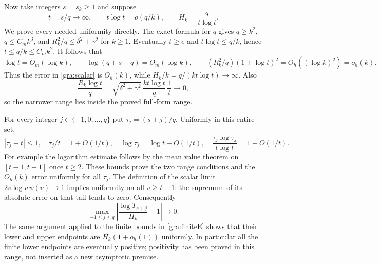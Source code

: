 \documentclass[11pt,a4paper]{article}
\begin{document}
Now take integers $s=s_k\ge1$ and suppose
\begin{equation}
 t=s/q\longrightarrow\infty,\qquad
 t\log t=o(q/k),\qquad H_k=\frac{q}{t\log t}.
 \tag{GRA19}\label{gra:narrow}
\end{equation}
We prove every needed uniformity directly.  The exact formula for $q$
gives $q\ge k^2$, $q\le C_mk^3$, and
$R_k^2/q\le\delta^2+\gamma^2$ for $k\ge1$.  Eventually $t\ge e$ and
$t\log t\le q/k$, hence $t\le q/k\le C_mk^2$.  It follows that
\[
 \log t=O_m(\log k),\qquad
 \log(q+s+q)=O_m(\log k),\qquad
 (R_k^2/q)(1+\log t)^2=O_h((\log k)^2)=o_h(k).
\]
Thus the error in \eqref{gra:scalar} is $O_h(k)$, while
$H_k/k=q/(kt\log t)\to\infty$.  Also
\[
 \frac{R_k\log t}{q}
 =\sqrt{\delta^2+\gamma^2}\,
   \frac{kt\log t}{q}\,\frac1t\longrightarrow0,
\]
so the narrower range lies inside the proved full-form range.

For every integer $j\in\{-1,0,\ldots,q\}$ put
$\tau_j=(s+j)/q$.  Uniformly in this entire set,
\[
 |\tau_j-t|\le1,\quad \tau_j/t=1+O(1/t),\quad
 \log\tau_j=\log t+O(1/t),\quad
 \frac{\tau_j\log\tau_j}{t\log t}=1+O(1/t).
\]
For example the logarithm estimate follows by the mean value theorem
on $[t-1,t+1]$ once $t\ge2$.  These bounds prove the two range
conditions and the $O_h(k)$ error uniformly for all $\tau_j$.
The definition of the scalar limit
$2v\log v\,\psi(v)\to1$ implies uniformity on all $v\ge t-1$:
the supremum of its absolute error on that tail tends to zero.
Consequently
\begin{equation}
 \max_{-1\le j\le q}
 \left|\frac{\log T_{s+j}}{H_k}-1\right|\longrightarrow0.
 \tag{GRA20}\label{gra:uniformT}
\end{equation}
The same argument applied to the finite bounds in
\eqref{gra:finiteE} shows that their lower and upper endpoints are
$H_k(1+o_h(1))$ uniformly.  In particular all the finite lower endpoints
are eventually positive; positivity has been proved in this range,
not inserted as a new asymptotic premise.
\end{document}
